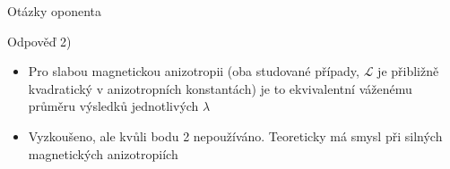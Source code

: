 \begin{frame}{Otázky oponenta}
\begin{exampleblock}{Odpověď 2)}
\begin{itemize}
\begin{itemize}
                    \item Pro slabou magnetickou anizotropii (oba studované případy, $\mathcal{L}$ je přibližně kvadratický v anizotropních konstantách) je to ekvivalentní váženému průměru výsledků jednotlivých $\lambda$
                    \item Vyzkoušeno, ale kvůli bodu 2 nepoužíváno. Teoreticky má smysl při silných magnetických anizotropiích
                \end{itemize}
        \end{itemize}
    \end{exampleblock}
    
\end{frame}


